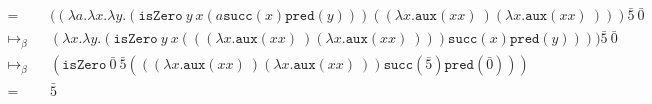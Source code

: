 \documentclass[11pt]{article}
\begin{document}
\begin{enumerate}
\begin{align*}
		      =             &  & (( \lambda a. \lambda x. \lambda y. ( \texttt{isZero} \: y \: x ( a \texttt{succ}(x) \texttt{pred}(y)))(( \lambda x. \texttt{aux}(x x) \:)( \lambda x. \texttt{aux}(x x) \:))) \bar{5} \: \bar{0} & \\ 
		      \mapsto_\beta &  & ( \lambda x. \lambda y. ( \texttt{isZero} \: y \: x ((( \lambda x. \texttt{aux}(x x) \:)( \lambda x. \texttt{aux}(x x) \:))) \texttt{succ}(x) \texttt{pred}(y)))) \bar{5} \: \bar{0}                & \\
		      \mapsto_\beta &  & ( \texttt{isZero} \: \bar{0}  \: \bar{5} ((( \lambda x. \texttt{aux}(x x) \:)( \lambda x. \texttt{aux}(x x) \:)) \texttt{succ}( \bar{5} ) \texttt{pred}( \bar{0} )))                               & \\
		      =             &  & \bar{5}
	      \end{align*}

\end{enumerate}
\end{document}
